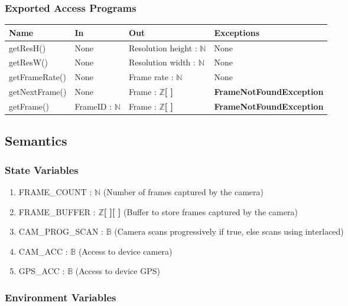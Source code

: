 \documentclass[12pt, titlepage]{article}
\begin{document}
\subsubsection{Exported Access Programs}

\begin{center}
\begin{tabular}{p{4cm} p{4cm} p{4cm} p{4cm}}
\hline
\textbf{Name} & \textbf{In} & \textbf{Out} & \textbf{Exceptions} \\
\hline
getResH() & None & Resolution height : $\mathbb{N}$ & None \\
\hline
getResW() & None & Resolution width : $\mathbb{N}$ & None \\
\hline
getFrameRate() & None & Frame rate : $\mathbb{N}$ & None \\
\hline
getNextFrame() & None & Frame : $\mathbb{Z}$\textbf{[ ]} & \textbf{FrameNotFoundException} \\
\hline
getFrame() & FrameID : $\mathbb{N}$ & Frame : $\mathbb{Z}$\textbf{[ ]} & \textbf{FrameNotFoundException} \\
\hline
\end{tabular}
\end{center}

\subsection{Semantics}

\subsubsection{State Variables}

\begin{enumerate}
  \item FRAME\_COUNT : $\mathbb{N}$ (Number of frames captured by the camera)
  \item FRAME\_BUFFER : $\mathbb{Z}$\textbf{[ ]}\textbf{[ ]} (Buffer to store frames captured by the camera)
  \item CAM\_PROG\_SCAN : $\mathbb{B}$ (Camera scans progressively if true, else scans using interlaced)
  \item CAM\_ACC : $\mathbb{B}$ (Access to device camera)
  \item GPS\_ACC : $\mathbb{B}$ (Access to device GPS)
\end{enumerate}

\subsubsection{Environment Variables}
\end{document}

